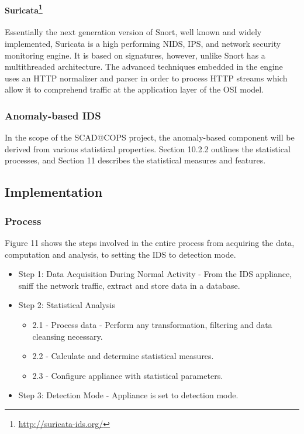 \documentclass[12pt,]{article}
\begin{document}
\paragraph[Suricata]{Suricata\footnote{\url{http://suricata-ids.org/}}}\label{suricata7}

Essentially the next generation version of Snort, well known and widely
implemented, Suricata is a high performing NIDS, IPS, and network
security monitoring engine. It is based on signatures, however, unlike
Snort has a multithreaded architecture. The advanced techniques embedded
in the engine uses an HTTP normalizer and parser in order to process
HTTP streams which allow it to comprehend traffic at the application
layer of the OSI model.

\subsubsection{Anomaly-based IDS}\label{anomaly-based-ids}

In the scope of the SCAD@COPS project, the anomaly-based component will
be derived from various statistical properties. Section 10.2.2 outlines
the statistical processes, and Section 11 describes the statistical
measures and features.

\subsection{Implementation}\label{implementation}

\subsubsection{Process}\label{process}

Figure 11 shows the steps involved in the entire process from acquiring
the data, computation and analysis, to setting the IDS to detection
mode.

\begin{itemize}
\itemsep1pt\parskip0pt
\item
  Step 1: Data Acquisition During Normal Activity - From the IDS
  appliance, sniff the network traffic, extract and store data in a
  database.
\item
  Step 2: Statistical Analysis

  \begin{itemize}
  \itemsep1pt\parskip0pt
  \item
    2.1 - Process data - Perform any transformation, filtering and data
    cleansing necessary.
  \item
    2.2 - Calculate and determine statistical measures.
  \item
    2.3 - Configure appliance with statistical parameters.
  \end{itemize}
\item
  Step 3: Detection Mode - Appliance is set to detection mode.
\end{itemize}
\end{document}
